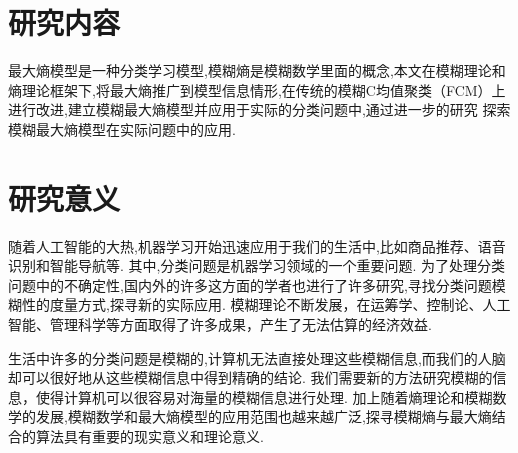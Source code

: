 \section{研究内容}
最大熵模型是一种分类学习模型,模糊熵是模糊数学里面的概念,本文在模糊理论和熵理论框架下,将最大熵推广到模型信息情形,在传统的模糊C均值聚类（FCM）上进行改进,建立模糊最大熵模型并应用于实际的分类问题中,通过进一步的研究 探索模糊最大熵模型在实际问题中的应用.
\section{研究意义}
随着人工智能的大热,机器学习开始迅速应用于我们的生活中,比如商品推荐、语音识别和智能导航等.
其中,分类问题是机器学习领域的一个重要问题.
为了处理分类问题中的不确定性,国内外的许多这方面的学者也进行了许多研究,寻找分类问题模糊性的度量方式,探寻新的实际应用.
模糊理论不断发展，在运筹学、控制论、人工智能、管理科学等方面取得了许多成果，产生了无法估算的经济效益.
\par
生活中许多的分类问题是模糊的,计算机无法直接处理这些模糊信息,而我们的人脑却可以很好地从这些模糊信息中得到精确的结论.
我们需要新的方法研究模糊的信息，使得计算机可以很容易对海量的模糊信息进行处理.
加上随着熵理论和模糊数学的发展,模糊数学和最大熵模型的应用范围也越来越广泛,探寻模糊熵与最大熵结合的算法具有重要的现实意义和理论意义.